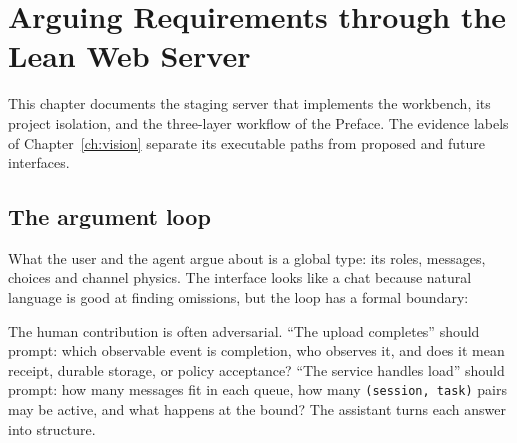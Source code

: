 \chapter{Arguing Requirements through the Lean Web Server}
\label{ch:web-server}

This chapter documents the staging server that implements the workbench, its
project isolation, and the three-layer workflow of the Preface. The evidence
labels of Chapter~\ref{ch:vision} separate its executable paths from proposed and
future interfaces.

\section{The argument loop}

What the user and the agent argue about is a global type: its roles, messages,
choices and channel physics. The interface looks like a chat because natural
language is good at finding omissions, but the loop has a formal boundary:

\begin{center}
\end{center}

The human contribution is often adversarial. ``The upload completes'' should
prompt: which observable event is completion, who observes it, and does it mean
receipt, durable storage, or policy acceptance? ``The service handles load''
should prompt: how many messages fit in each queue, how many
\texttt{(session, task)} pairs may be active, and what happens at the bound? The
assistant turns each answer into structure.

